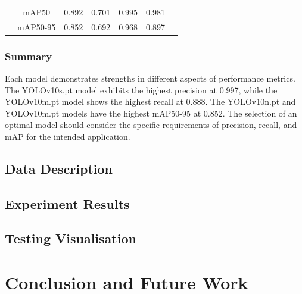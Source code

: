 \documentclass[12pt,oneside]{book} %
\begin{document}
\begin{table}[h!]
\begin{adjustbox}{max width=\textwidth}
\begin{tabular}{lcccccc}
                                                  & mAP50           & 0.892        & 0.701                       & 0.995                          & 0.981                     \\
                                                  & mAP50-95        & 0.852        & 0.692                       & 0.968                          & 0.897                     \\
            \bottomrule
        \end{tabular}
    \end{adjustbox}
    \label{tab:comparison}
\end{table}

\subsection{Summary}

Each model demonstrates strengths in different aspects of performance metrics.
The YOLOv10s.pt model exhibits the highest precision at 0.997, while the
YOLOv10m.pt model shows the highest recall at 0.888. The YOLOv10n.pt and
YOLOv10m.pt models have the highest mAP50-95 at 0.852. The selection of an
optimal model should consider the specific requirements of precision, recall,
and mAP for the intended application.

\section{Data Description}

\section{Experiment Results}

\section{Testing Visualisation}

\chapter{Conclusion and Future Work}\label{chap:conclusion}

%



\end{document}
